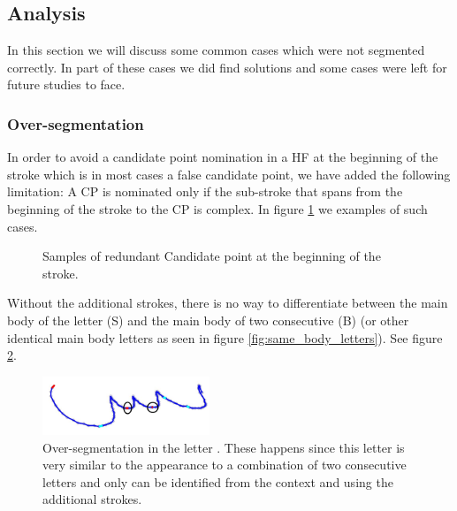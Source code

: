 \documentclass[journal,compsoc]{IEEEtran}
\begin{document}
\subsection{Analysis}
In this section we will discuss some common cases which were not segmented correctly. In part of these cases we did find solutions and some cases were left for future studies to face. 
\subsubsection{Over-segmentation}
In order to avoid a candidate point nomination in a HF at the beginning of the stroke which is in most cases a false candidate point, we have added the following limitation: A CP is nominated only if the sub-stroke that spans from the beginning of the stroke to the CP is complex.
In figure \ref{fig:oversegmentation_begin} we examples of such cases.

\begin{figure}[h]
\centering
    \caption{Samples of redundant Candidate point at the beginning of the stroke.}
   \label{fig:oversegmentation_begin}
\end{figure}

Without the additional strokes, there is no way to differentiate between the main body of the letter  (S) and the main body of two consecutive  (B) (or other identical main body letters as seen in figure \ref{fig:same_body_letters}). See figure \ref{fig:oversegmentation_s}.  

\begin{figure}
\centering
\includegraphics[width=5cm]{./figures/oversegmentation_s}
\caption{Over-segmentation in the letter . These happens since this letter is very similar to the appearance to a combination of two consecutive  letters and only can be identified from the context and using the additional strokes.}
\label{fig:oversegmentation_s}
\end{figure}
\end{document}
